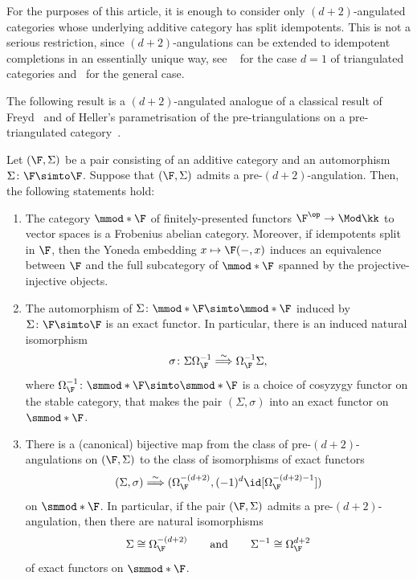 \documentclass[a4paper]{amsart}
\begin{document}
\begin{remark}
  For the purposes of this article, it is enough to consider only
  $(d+2)$-angulated categories whose underlying additive category has split
  idempotents. This is not a serious restriction, since $(d+2)$-angulations can
  be extended to idempotent completions in an essentially unique way, see
  ~\cite{BS01} for the case $d=1$ of triangulated categories and~\cite{Lin21}
  for the general case.
\end{remark}

The following result is a $(d+2)$-angulated analogue of a classical result of
Freyd~\cite{Fre66} and of Heller's parametrisation of the pre-triangulations on
a pre-triangulated category~\cite{Hel68}.

\begin{proposition}
  \label{prop:GKO-Freyd-Heller}
  Let $(\F,\Sigma)$ be a pair consisting of an additive category and an
  automorphism $\Sigma\colon\F\simto\F$. Suppose that $(\F,\Sigma)$ admits a
  pre-$(d+2)$-angulation. Then, the following statements hold:
  \begin{enumerate}
  \item\label{it:modF-Frobenius} The category $\mmod*\F$ of finitely-presented
    functors $\F^\op\to\Mod\kk$ to vector spaces is a Frobenius abelian
    category. Moreover, if idempotents split in $\F$, then the Yoneda embedding
    $x\mapsto\F(-,x)$ induces an equivalence between $\F$ and the full
    subcategory of $\mmod*\F$ spanned by the projective-injective objects.
  \item The automorphism of $\Sigma\colon\mmod*\F\simto\mmod*\F$ induced by
    $\Sigma\colon\F\simto\F$ is an exact functor. In particular, there is an
    induced natural isomorphism %
    \[
      \sigma\colon\Sigma\Omega_\F^{-1}\stackrel{\sim}{\Longrightarrow}\Omega_\F^{-1}\Sigma,
    \]
    where $\Omega_\F^{-1}\colon\smmod*{\F}\simto\smmod*\F$ is a choice of
    cosyzygy functor on the stable category, that makes the pair
    $(\Sigma,\sigma)$ into an exact functor on $\smmod*\F$.
  \item\label{it:Sigma-d+2-syzygy} There is a (canonical) bijective map from the
    class of pre-$(d+2)$-angulations on $(\F,\Sigma)$ to the class of
    isomorphisms of exact functors
    \[
      (\Sigma,\sigma)\stackrel{\sim}{\Longrightarrow}(\Omega_\F^{-(d+2)},(-1)^d\id[\Omega_\F^{-(d+2)-1}])
    \]
    on $\smmod*\F$. In particular, if the pair $(\F,\Sigma)$ admits a
    pre-$(d+2)$-angulation, then there are natural isomorphisms
    \[
      \Sigma\cong\Omega_\F^{-(d+2)}\qquad\text{and}\qquad\Sigma^{-1}\cong\Omega_\F^{d+2}
    \]
    of exact functors on $\smmod*{\F}$. \end {enumerate}
\end{proposition}
\end{document}
